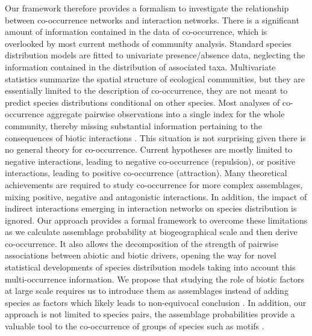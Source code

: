 Our framework therefore provides a formalism to investigate the relationship between co-occurrence networks \citep{Araujo2011Using} and interaction networks. There is a significant amount of information contained in the data of co-occurrence, which is overlooked by most current methods of community analysis. Standard species distribution models are fitted to univariate presence/absence data, neglecting the information contained in the distribution of associated taxa. Multivariate statistics summarize the spatial structure of ecological communities, but they are essentially limited to the description of co-occurrence, they are not meant to predict species distributions conditional on other species. Most analyses of co-occurrence aggregate pairwise observations into a single index for the whole community, thereby missing substantial information pertaining to the consequences of biotic interactions \citep{Boulangeat2012Accounting}. This situation is not surprising given there is no general theory for co-occurrence. Current hypotheses are mostly limited to negative interactions, leading to negative co-occurrence (repulsion), or positive interactions, leading to positive co-occurrence (attraction). Many theoretical achievements are required to study co-occurrence for more complex assemblages, mixing positive, negative and antagonistic interactions. In addition, the impact of indirect interactions emerging in interaction networks on species distribution is ignored. Our approach provides a formal framework to overcome these limitations as we calculate assemblage probability at biogeographical scale and then derive co-occurrence. It also allows the decomposition of the strength of pairwise associations between abiotic and biotic drivers, opening the way for novel statistical developments of species distribution models taking into account this multi-occurrence information. We propose that studying the role of biotic factors at large scale requires us to introduce them as assemblages instead of adding species as factors which likely leads to non-equivocal conclusion \citep{Araujo2007Importance}. In addition, our approach is not limited to species pairs, the assemblage probabilities provide a valuable tool to the co-occurrence of groups of species such as motifs \citep{Stouffer2007Evidence}.

